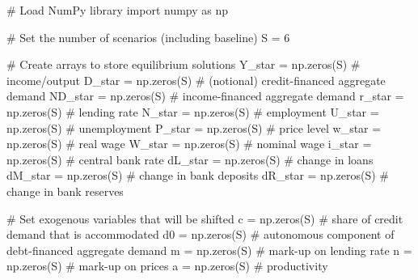 \documentclass[
  letterpaper,
  DIV=11,
  numbers=noendperiod]{scrreprt}
\newenvironment{Shaded}{\begin{snugshade}}{\end{snugshade}}
\newcommand{\CommentTok}[1]{\textcolor[rgb]{0.37,0.37,0.37}{#1}}
\newcommand{\DecValTok}[1]{\textcolor[rgb]{0.68,0.00,0.00}{#1}}
\newcommand{\ImportTok}[1]{\textcolor[rgb]{0.00,0.46,0.62}{#1}}
\newcommand{\NormalTok}[1]{\textcolor[rgb]{0.00,0.23,0.31}{#1}}
\newcommand{\OperatorTok}[1]{\textcolor[rgb]{0.37,0.37,0.37}{#1}}
\begin{document}
\begin{tcolorbox}[enhanced jigsaw, titlerule=0mm, breakable, bottomrule=.15mm, toprule=.15mm, colbacktitle=quarto-callout-note-color!10!white, rightrule=.15mm, toptitle=1mm, opacityback=0, left=2mm, coltitle=black, title=\textcolor{quarto-callout-note-color}{\faInfo}\hspace{0.5em}{Python code}, colframe=quarto-callout-note-color-frame, opacitybacktitle=0.6, leftrule=.75mm, bottomtitle=1mm, arc=.35mm, colback=white]

\begin{Shaded}
\begin{Highlighting}[]
\CommentTok{\# Load NumPy library}
\ImportTok{import}\NormalTok{ numpy }\ImportTok{as}\NormalTok{ np}

\CommentTok{\# Set the number of scenarios (including baseline)}
\NormalTok{S }\OperatorTok{=} \DecValTok{6}

\CommentTok{\# Create arrays to store equilibrium solutions}
\NormalTok{Y\_star }\OperatorTok{=}\NormalTok{ np.zeros(S)  }\CommentTok{\# income/output}
\NormalTok{D\_star }\OperatorTok{=}\NormalTok{ np.zeros(S)  }\CommentTok{\# (notional) credit{-}financed aggregate demand}
\NormalTok{ND\_star }\OperatorTok{=}\NormalTok{ np.zeros(S)  }\CommentTok{\# income{-}financed aggregate demand}
\NormalTok{r\_star }\OperatorTok{=}\NormalTok{ np.zeros(S)  }\CommentTok{\# lending rate}
\NormalTok{N\_star }\OperatorTok{=}\NormalTok{ np.zeros(S)  }\CommentTok{\# employment}
\NormalTok{U\_star }\OperatorTok{=}\NormalTok{ np.zeros(S)  }\CommentTok{\# unemployment}
\NormalTok{P\_star }\OperatorTok{=}\NormalTok{ np.zeros(S)  }\CommentTok{\# price level}
\NormalTok{w\_star }\OperatorTok{=}\NormalTok{ np.zeros(S)  }\CommentTok{\# real wage}
\NormalTok{W\_star }\OperatorTok{=}\NormalTok{ np.zeros(S)  }\CommentTok{\# nominal wage}
\NormalTok{i\_star }\OperatorTok{=}\NormalTok{ np.zeros(S)  }\CommentTok{\# central bank rate}
\NormalTok{dL\_star }\OperatorTok{=}\NormalTok{ np.zeros(S)  }\CommentTok{\# change in loans}
\NormalTok{dM\_star }\OperatorTok{=}\NormalTok{ np.zeros(S)  }\CommentTok{\# change in bank deposits}
\NormalTok{dR\_star }\OperatorTok{=}\NormalTok{ np.zeros(S)  }\CommentTok{\# change in bank reserves}

\CommentTok{\# Set exogenous variables that will be shifted}
\NormalTok{c }\OperatorTok{=}\NormalTok{ np.zeros(S)  }\CommentTok{\# share of credit demand that is accommodated}
\NormalTok{d0 }\OperatorTok{=}\NormalTok{ np.zeros(S)  }\CommentTok{\# autonomous component of debt{-}financed aggregate demand}
\NormalTok{m }\OperatorTok{=}\NormalTok{ np.zeros(S)  }\CommentTok{\# mark{-}up on lending rate}
\NormalTok{n }\OperatorTok{=}\NormalTok{ np.zeros(S)  }\CommentTok{\# mark{-}up on prices}
\NormalTok{a }\OperatorTok{=}\NormalTok{ np.zeros(S)  }\CommentTok{\# productivity}


\end{Highlighting}
\end{Shaded}
\end{tcolorbox}
\end{document}
